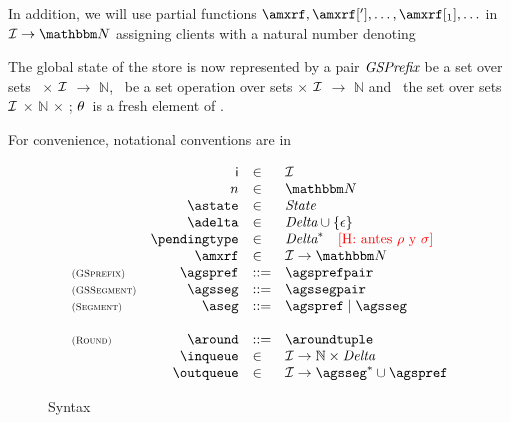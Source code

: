 \documentclass[envcountsect,runningheads,orivec]{llncs}
\begin{document}
In addition,  we will use partial functions  $\amxrf,\amxrf['],\ldots, \amxrf[{_1}],\ldots$ in  $\idset\rightarrow \nat$
assigning clients with a natural number denoting 


The global state of the store is now represented by a pair $\textit{GSPrefix}$ be a set over sets \statetype\ $\times$ $\mathcal{\mathcal{I}}$ $\rightarrow$ $\mathbb{N}$, \gssegmenttype\ be a set operation over sets \deltatype $\times$ $\mathcal{\mathcal{I}}$ $\rightarrow$ $\mathbb{N}$ and \roundtype\ the set over sets $\mathcal{\mathcal{I}}$ $\times$ $\mathbb{N}$ $\times$ \deltatype; $\theta$\ is a fresh element of \gssegmenttype.
%

For convenience, notational conventions are in~\figref{}
\begin{figure}
  \[
   \begin{array}{lrll}
       & \cid & \in & \idset
       \\
       & n & \in & \nat
       \\
       &\astate & \in & \statetype
       \\
       &\adelta & \in & \deltatype \cup \{\epsilon\}
       \\
       &\pendingtype & \in & \deltatype^* \quad \mbox{\henote{antes $\rho$ y $\sigma$}}\\
       &\amxrf & \in & \idset\rightarrow \nat
       \\
       \rName{GSprefix}
       &
       \agspref & ::= & \agsprefpair
       \\
       \rName{GSSegment}
       &
       \agsseg & ::= & \agssegpair
       \\
       \rName{Segment}
       &
       \aseg & ::= & \agspref \; |\;  \agsseg
        \\
        \\
       \rName{Round}
       &
       \around &::= & \aroundtuple
       \\
       &
       {\inqueue} & \in  & \partialfunction{\idset}{\dominserver}
       \\
       & 
       \outqueue &\in & \partialfunction{\idset}{{\agsseg}^* \cup \agspref}
   \end{array}
  \]
  \caption{Syntax}
  \label{fig:syntax-implementation}
\end{figure}
\end{document}
